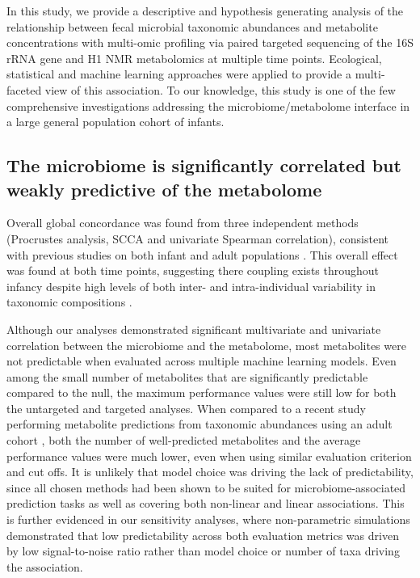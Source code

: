 In this study, we provide a descriptive and hypothesis generating analysis of  the relationship between fecal microbial taxonomic abundances and metabolite concentrations with multi-omic profiling via paired targeted sequencing of the 16S rRNA gene and H1 NMR metabolomics at multiple time points. Ecological, statistical and machine learning approaches were applied to provide a multi-faceted view of this association. To our knowledge, this study is one of the few comprehensive investigations addressing the microbiome/metabolome interface in a large general population cohort of infants. 

\subsection{The microbiome is significantly correlated but weakly predictive of the metabolome}

Overall global concordance was found from three independent methods (Procrustes analysis, SCCA and univariate Spearman correlation), consistent with previous studies on both infant \cite{ayeni2018infant, kisuse2018urban} and adult populations \cite{lloyd-price2019multiomics, mchardy2013integrative}. This overall effect was found at both time points, suggesting there coupling exists throughout infancy despite high levels of both inter- and intra-individual variability in taxonomic compositions \cite{backhed2015dynamics}. 

Although our analyses demonstrated significant multivariate and univariate correlation between the microbiome and the metabolome, most metabolites were not predictable when evaluated across multiple machine learning models. Even among the small number of metabolites that are significantly predictable compared to the null, the maximum performance values were still low for both the untargeted and targeted analyses. When compared to a recent study performing metabolite predictions from taxonomic abundances using an adult cohort \cite{mallick2019predictive}, both the number of well-predicted metabolites and the average performance values were much lower, even when using similar evaluation criterion and cut offs. It is unlikely that model choice was driving the lack of predictability, since all chosen methods had been shown to be suited for microbiome-associated prediction tasks \cite{zhou2019review, pasolli2016machine} as well as covering both non-linear and linear associations. This is further evidenced in our sensitivity analyses, where non-parametric simulations demonstrated that low predictability across both evaluation metrics was driven by low signal-to-noise ratio rather than model choice or number of taxa driving the association.

